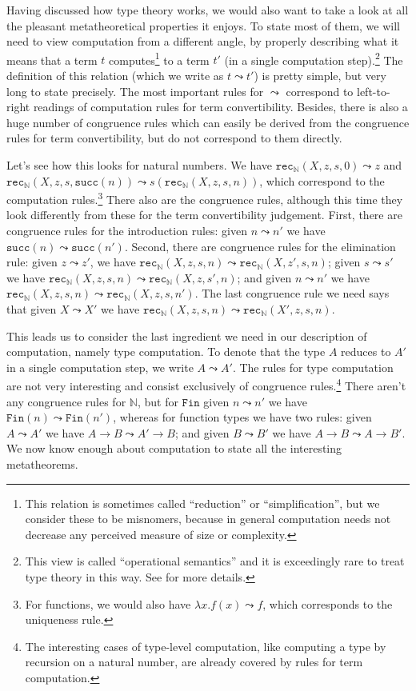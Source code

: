 \documentclass[declaration,mgr,english,shortabstract]{iithesis}
\newcommand{\m}[1]{\texttt{#1}}
\newcommand{\N}{\mathbb{N}}
\newcommand{\suc}[1]{\m{succ}(#1)}
\newcommand{\recN}[4]{\m{rec}_\N(#1, #2, #3, #4)}
\newcommand{\Fin}[1]{\m{Fin}(#1)}
\begin{document}
Having discussed how type theory works, we would also want to take a look at all the pleasant metatheoretical properties it enjoys. To state most of them, we will need to view computation from a different angle, by properly describing what it means that a term $t$ computes\footnote{This relation is sometimes called ``reduction'' or ``simplification'', but we consider these to be misnomers, because in general computation needs not decrease any perceived measure of size or complexity.} to a term $t'$ (in a single computation step).\footnote{This view is called ``operational semantics'' and it is exceedingly rare to treat type theory in this way. See \cite{Goguen} for more details.} The definition of this relation (which we write as $t \leadsto t'$) is pretty simple, but very long to state precisely. The most important rules for $\leadsto$ correspond to left-to-right readings of computation rules for term convertibility. Besides, there is also a huge number of congruence rules which can easily be derived from the congruence rules for term convertibility, but do not correspond to them directly.

Let's see how this looks for natural numbers. We have $\recN{X}{z}{s}{0} \leadsto z$ and $\recN{X}{z}{s}{\suc{n}} \leadsto s(\recN{X}{z}{s}{n})$, which correspond to the computation rules.\footnote{For functions, we would also have $\lambda x.f(x) \leadsto f$, which corresponds to the uniqueness rule.} There also are the congruence rules, although this time they look differently from these for the term convertibility judgement. First, there are congruence rules for the introduction rules: given $n \leadsto n'$ we have $\suc{n} \leadsto \suc{n'}$. Second, there are congruence rules for the elimination rule: given $z \leadsto z'$, we have $\recN{X}{z}{s}{n} \leadsto \recN{X}{z'}{s}{n}$; given $s \leadsto s'$ we have $\recN{X}{z}{s}{n} \leadsto \recN{X}{z}{s'}{n}$; and given $n \leadsto n'$ we have $\recN{X}{z}{s}{n} \leadsto \recN{X}{z}{s}{n'}$. The last congruence rule we need says that given $X \leadsto X'$ we have $\recN{X}{z}{s}{n} \leadsto \recN{X'}{z}{s}{n}$.

This leads us to consider the last ingredient we need in our description of computation, namely type computation. To denote that the type $A$ reduces to $A'$ in a single computation step, we write $A \leadsto A'$. The rules for type computation are not very interesting and consist exclusively of congruence rules.\footnote{The interesting cases of type-level computation, like computing a type by recursion on a natural number, are already covered by rules for term computation.} There aren't any congruence rules for $\N$, but for $\m{Fin}$ given $n \leadsto n'$ we have $\Fin{n} \leadsto \Fin{n'}$, whereas for function types we have two rules: given $A \leadsto A'$ we have $A \to B \leadsto A' \to B$; and given $B \leadsto B'$ we have $A \to B \leadsto A \to B'$. We now know enough about computation to state all the interesting metatheorems.
\end{document}
